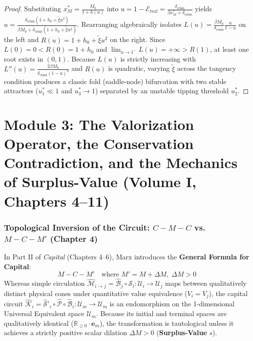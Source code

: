 \documentclass[11pt,a4paper]{article}
\begin{document}
\begin{proof}
Substituting $x_M^* = \frac{M_0}{1 + h(u)}$ into $u = 1 - \mathcal{E}_{\text{real}} = \frac{\delta_{\text{crisis}}}{\beta x_M^* + \delta_{\text{crisis}}}$ yields $u = \frac{\delta_{\text{crisis}}(1 + h_0 + \tilde{\xi} u^2)}{\beta M_0 + \delta_{\text{crisis}}(1 + h_0 + \tilde{\xi} u^2)}$. Rearranging algebraically isolates $L(u) = \frac{\beta M_0}{\delta_{\text{crisis}}} \frac{u}{1-u}$ on the left and $R(u) = 1 + h_0 + \tilde{\xi} u^2$ on the right. Since $L(0) = 0 < R(0) = 1 + h_0$ and $\lim_{u \to 1^-} L(u) = +\infty > R(1)$, at least one root exists in $(0,1)$. Because $L(u)$ is strictly increasing with $L''(u) = \frac{2\beta M_0}{\delta_{\text{crisis}}(1-u)^3}$ and $R(u)$ is quadratic, varying $\tilde{\xi}$ across the tangency condition produces a classic fold (saddle-node) bifurcation with two stable attractors ($u_1^* \ll 1$ and $u_3^* \to 1$) separated by an unstable tipping threshold $u_2^*$.
\end{proof}

\newpage

\part{Module 3: The Valorization Operator, the Conservation Contradiction, and the Mechanics of Surplus-Value (Volume I, Chapters 4--11)}

\section{Topological Inversion of the Circuit: $C - M - C$ vs. $M - C - M'$ (Chapter 4)}

In Part II of \textit{Capital} (Chapters 4--6), Marx introduces the \textbf{General Formula for Capital}:
\begin{equation}
    M - C - M' \quad \text{where } M' = M + \Delta M, \; \Delta M > 0
\end{equation}
Whereas simple circulation $\hat{\mathcal{M}}_{i \to j} = \hat{\mathcal{B}}_j \circ \hat{\mathcal{S}}_i : \mathcal{U}_i \to \mathcal{U}_j$ maps between qualitatively distinct physical cones under quantitative value equivalence ($V_i = V_j$), the capital circuit $\hat{\mathcal{K}}_i = \hat{\mathcal{S}}'_i \circ \hat{\mathcal{P}} \circ \hat{\mathcal{B}}_i : \mathcal{U}_m \to \mathcal{U}_m$ is an endomorphism on the 1-dimensional Universal Equivalent space $\mathcal{U}_m$. Because its initial and terminal spaces are qualitatively identical ($\mathbb{R}_{\ge 0} \cdot \mathbf{e}_m$), the transformation is tautological unless it achieves a strictly positive scalar dilation $\Delta M > 0$ (\textbf{Surplus-Value} $s$).
\end{document}
